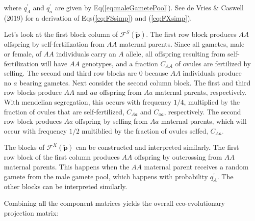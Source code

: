 \documentclass[11pt]{article}
\def\mbf#1{\mathbf{#1}}
\def\mcal#1{\mathcal{#1}}
\begin{document}
\noindent where $q^{\prime}_A$ and $q^{\prime}_a$ are given by Eq(\ref{eq:maleGametePool}). See de Vries \& Caswell (2019) for a derivation of Eqs(\ref{eq:FSsimp}) and (\ref{eq:FXsimp}).

Let's look at the first block column of $\mcal{F}^S(\tilde{\mbf{p}})$. The first row block produces $AA$ offspring by self-fertilization from $AA$ maternal parents. Since all gametes, male or female, of $AA$ individuals carry an $A$ allele, all offspring resulting from self-fertilization will have $AA$ genotypes, and a fraction $C_{AA}$ of ovules are fertilized by selfing. The second and third row blocks are $0$ because $AA$ individuals produce no $a$ bearing gametes. Next consider the second column block. The first and third row blocks produce $AA$ and $aa$ offspring from $Aa$ maternal parents, respectively. With mendelian segregation, this occurs with frequency $1/4$, multiplied by the fraction of ovules that are self-fertilized, $C_{Aa}$ and $C_{aa}$, respectively. The second row block produces $Aa$ offspring by selfing from $Aa$ maternal parents, which will occur with frequency $1/2$ multiblied by the fraction of ovules selfed, $C_{Aa}$. 

The blocks of $\mcal{F}^X(\tilde{\mbf{p}})$ can be constructed and interpreted similarly. The first row block of the first column produces $AA$ offspring by outcrossing from $AA$ maternal parents. This happens when the $AA$ maternal parent receives a random gamete from the male gamete pool, which happens with probability $q^{\prime}_{A}$. The other blocks can be interpreted similarly.

Combining all the component matrices yields the overall eco-evolutionary projection matrix:
\end{document}
